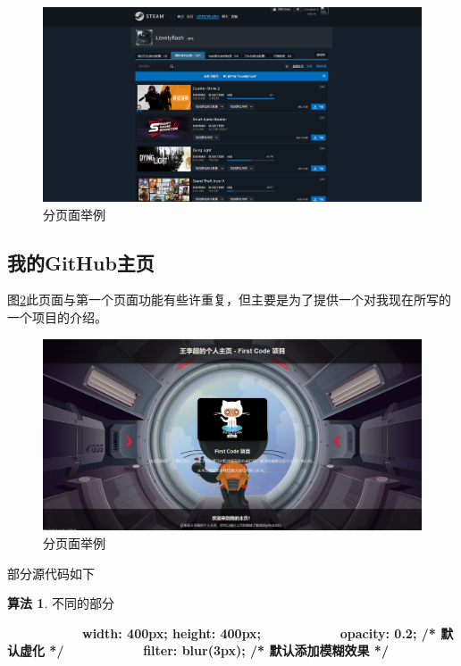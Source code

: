 \documentclass[supercite]{Experimental_Report}
\theoremstyle{definition}
\newtheorem{alg}{算法}[section]
\begin{document}
\begin{figure}[htb]
	\begin{center}
		\includegraphics[scale=0.30]{images/3-3.png}
		\caption{分页面举例}
		\label{fig3-3}
	\end{center}
\end{figure}

\subsection{我的GitHub主页}

图\ref{fig3-4}此页面与第一个页面功能有些许重复，但主要是为了提供一个对我现在所写的一个项目的介绍。

\begin{figure}[htb]
	\begin{center}
		\includegraphics[scale=0.25]{images/3-4.png}
		\caption{分页面举例}
		\label{fig3-4}
	\end{center}
\end{figure}

部分源代码如下

\begin{shaded*}
	\begin{alg}{不同的部分}
		\label{alg:1}
		\begin{algorithmic}
			\State \ \ \ \ \ \ \ \ \ \ \ \ \textbf{width: 400px;  height: 400px; }
			\State \ \ \ \ \ \ \ \ \ \ \ \ \textbf{opacity: 0.2; /* 默认虚化 */}
			\State \ \ \ \ \ \ \ \ \ \ \ \ \textbf{filter: blur(3px); /* 默认添加模糊效果 */}
		\end{algorithmic}
	\end{alg}
	\end{shaded*}
\end{document}
